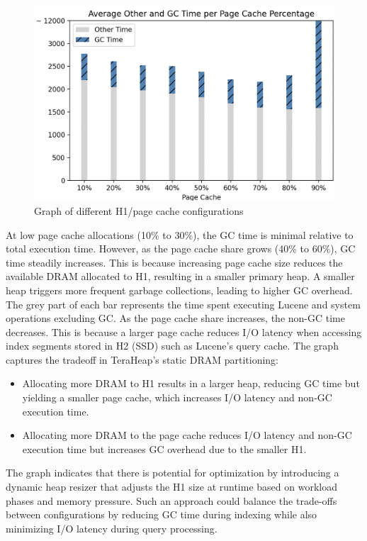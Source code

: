 \begin{figure}[htbp]
  \centering
  \includegraphics[width=1\columnwidth]{fig/numbers.png}
  \caption{Graph of different H1/page cache configurations}
  \label{fig:graph}
\end{figure}

At low page cache allocations (10\% to 30\%), the GC time is minimal relative to total execution time. However, as the page cache share grows (40\% to 60\%), GC time steadily increases. This is because increasing page cache size reduces the available DRAM allocated to H1, resulting in a smaller primary heap. A smaller heap triggers more frequent garbage collections, leading to higher GC overhead.
The grey part of each bar represents the time spent executing Lucene and system operations excluding GC. As the page cache share increases, the non-GC time decreases. This is because a larger page cache reduces I/O latency when accessing index segments stored in H2 (SSD) such as Lucene's query cache.
The graph captures the tradeoff in TeraHeap’s static DRAM partitioning: \vspace{-0.5em} 
\begin{itemize} 
  \item Allocating more DRAM to H1 results in a larger heap, reducing GC time but yielding a smaller page cache, which increases I/O latency and non-GC execution time.
  \item Allocating more DRAM to the page cache reduces I/O latency and non-GC execution time but increases GC overhead due to the smaller H1.
\end{itemize} 
\vspace{-0.5em}
The graph indicates that there is potential for optimization by introducing a dynamic heap resizer that adjusts the H1 size at runtime based on workload phases and memory pressure. Such an approach could balance the trade-offs between configurations by reducing GC time during indexing while also minimizing I/O latency during query processing. 

